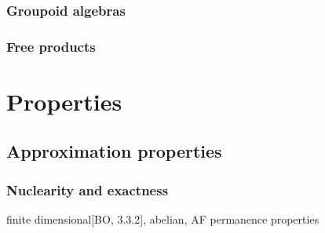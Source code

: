 \documentclass{../../large}
\begin{document}
\section{Groupoid algebras}











\section{Free products}






\part{Properties}
\chapter{Approximation properties}
\section{Nuclearity and exactness}

finite dimensional[BO, 3.3.2], abelian, AF
permanence properties
\end{document}
